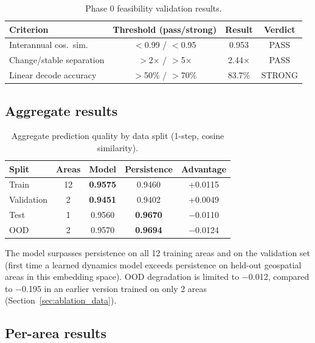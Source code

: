 \documentclass{article}
\begin{document}
\begin{table}[htbp]
\centering
\caption{Phase 0 feasibility validation results.}
\label{tab:phase0}
\begin{tabular}{lccc}
\toprule
Criterion & Threshold (pass/strong) & Result & Verdict \\
\midrule
Interannual cos.~sim. & $<$0.99 / $<$0.95 & 0.953 & PASS \\
Change/stable separation & $>$2$\times$ / $>$5$\times$ & 2.44$\times$ & PASS \\
Linear decode accuracy & $>$50\% / $>$70\% & 83.7\% & STRONG \\
\bottomrule
\end{tabular}
\end{table}

\subsection{Aggregate results}

\begin{table}[htbp]
\centering
\caption{Aggregate prediction quality by data split (1-step, cosine similarity).}
\label{tab:aggregate}
\begin{tabular}{lcccc}
\toprule
Split & Areas & Model & Persistence & Advantage \\
\midrule
Train & 12 & \textbf{0.9575} & 0.9460 & +0.0115 \\
Validation & 2 & \textbf{0.9451} & 0.9402 & +0.0049 \\
Test & 1 & 0.9560 & \textbf{0.9670} & $-$0.0110 \\
OOD & 2 & 0.9570 & \textbf{0.9694} & $-$0.0124 \\
\bottomrule
\end{tabular}
\end{table}

The model surpasses persistence on all 12 training areas and on the validation set (first time a learned dynamics model exceeds persistence on held-out geospatial areas in this embedding space). OOD degradation is limited to $-$0.012, compared to $-$0.195 in an earlier version trained on only 2 areas (Section~\ref{sec:ablation_data}).

\subsection{Per-area results}
\end{document}
